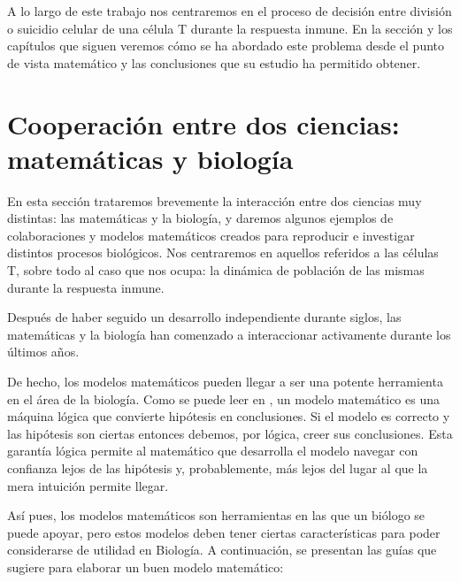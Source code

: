 A lo largo de este trabajo nos centraremos en el proceso de decisión entre división o suicidio celular de una célula T durante la respuesta inmune. En la sección y los capítulos que siguen veremos cómo se ha abordado este problema desde el punto de vista matemático y las conclusiones que su estudio ha permitido obtener. 


\section{Cooperación entre dos ciencias: matemáticas y biología}
\label{sec:coop}

En esta sección trataremos brevemente la interacción entre dos ciencias muy distintas: las matemáticas y la biología, y daremos algunos ejemplos de colaboraciones y modelos matemáticos creados para reproducir e investigar distintos procesos biológicos. Nos centraremos en aquellos referidos a las células T, sobre todo al caso que nos ocupa: la dinámica de población de las mismas durante la respuesta inmune.

Después de haber seguido un desarrollo independiente durante siglos, las matemáticas y la biología han comenzado a interaccionar activamente durante los últimos años.


De hecho, los modelos matemáticos pueden llegar a ser una potente herramienta en el área de la biología. Como se puede leer en \cite{Gunawardena2014}, un modelo matemático es una máquina lógica que convierte hipótesis en conclusiones. Si el modelo es correcto y las hipótesis son ciertas entonces debemos, por lógica, creer sus conclusiones. Esta garantía lógica permite al matemático que desarrolla el modelo navegar con confianza lejos de las hipótesis y, probablemente, más lejos del lugar al que la mera intuición permite llegar. %

Así pues, los modelos matemáticos son herramientas en las que un biólogo se puede apoyar, pero estos modelos deben tener ciertas características para poder considerarse de utilidad en Biología. A continuación, se presentan las guías que sugiere \cite{Gunawardena2014} para elaborar un buen modelo matemático:

